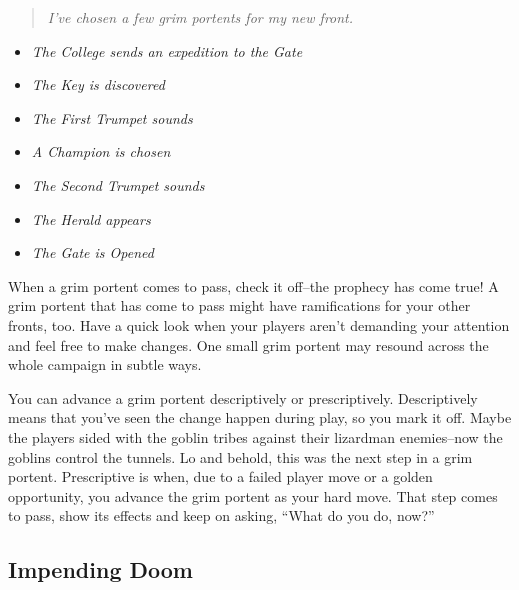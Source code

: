 \begin{quote}
\emph{I've chosen a few grim portents for my new front.}
\end{quote}
\begin{itemize}
\item \emph{The College sends an expedition to the Gate}
\item \emph{The Key is discovered}
\item \emph{The First Trumpet sounds}
\item \emph{A Champion is chosen}
\item \emph{The Second Trumpet sounds}
\item \emph{The Herald appears}
\item \emph{The Gate is Opened}

\end{itemize}


 When a grim portent comes to pass, check it off--the prophecy has come true! A grim portent that has come to pass might have ramifications for your other fronts, too. Have a quick look when your players aren't demanding your attention and feel free to make changes. One small grim portent may resound across the whole campaign in subtle ways.


 You can advance a grim portent descriptively or prescriptively. Descriptively means that you've seen the change happen during play, so you mark it off. Maybe the players sided with the goblin tribes against their lizardman enemies--now the goblins control the tunnels. Lo and behold, this was the next step in a grim portent. Prescriptive is when, due to a failed player move or a golden opportunity, you advance the grim portent as your hard move. That step comes to pass, show its effects and keep on asking, ``What do you do, now?''
\subsection{Impending Doom}


